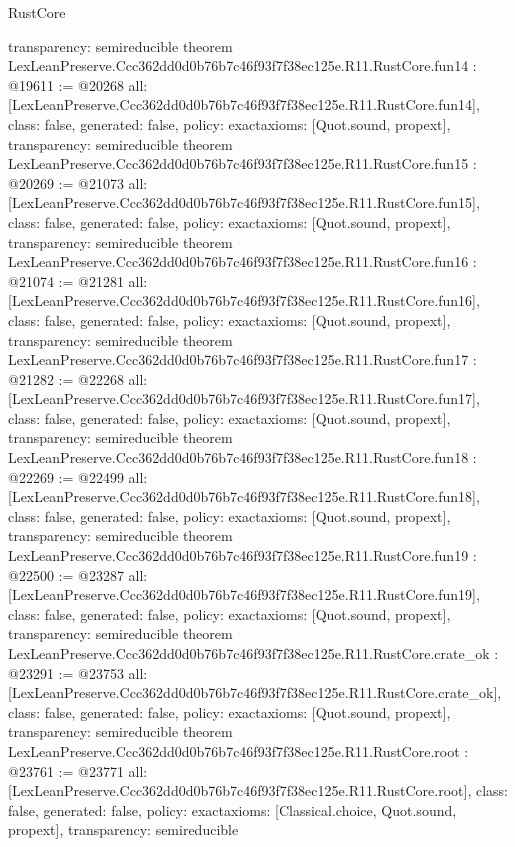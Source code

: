 \begin{lexlean}{RustCore}
\begin{coremodule}
{  transparency: semireducible
}
theorem LexLeanPreserve.Ccc362dd0d0b76b7c46f93f7f38ec125e.R11.RustCore.fun14 : @19611 := @20268 {
  all: [LexLeanPreserve.Ccc362dd0d0b76b7c46f93f7f38ec125e.R11.RustCore.fun14],
  class: false,
  generated: false,
  policy: exact{axioms: [Quot.sound, propext]},
  transparency: semireducible
}
theorem LexLeanPreserve.Ccc362dd0d0b76b7c46f93f7f38ec125e.R11.RustCore.fun15 : @20269 := @21073 {
  all: [LexLeanPreserve.Ccc362dd0d0b76b7c46f93f7f38ec125e.R11.RustCore.fun15],
  class: false,
  generated: false,
  policy: exact{axioms: [Quot.sound, propext]},
  transparency: semireducible
}
theorem LexLeanPreserve.Ccc362dd0d0b76b7c46f93f7f38ec125e.R11.RustCore.fun16 : @21074 := @21281 {
  all: [LexLeanPreserve.Ccc362dd0d0b76b7c46f93f7f38ec125e.R11.RustCore.fun16],
  class: false,
  generated: false,
  policy: exact{axioms: [Quot.sound, propext]},
  transparency: semireducible
}
theorem LexLeanPreserve.Ccc362dd0d0b76b7c46f93f7f38ec125e.R11.RustCore.fun17 : @21282 := @22268 {
  all: [LexLeanPreserve.Ccc362dd0d0b76b7c46f93f7f38ec125e.R11.RustCore.fun17],
  class: false,
  generated: false,
  policy: exact{axioms: [Quot.sound, propext]},
  transparency: semireducible
}
theorem LexLeanPreserve.Ccc362dd0d0b76b7c46f93f7f38ec125e.R11.RustCore.fun18 : @22269 := @22499 {
  all: [LexLeanPreserve.Ccc362dd0d0b76b7c46f93f7f38ec125e.R11.RustCore.fun18],
  class: false,
  generated: false,
  policy: exact{axioms: [Quot.sound, propext]},
  transparency: semireducible
}
theorem LexLeanPreserve.Ccc362dd0d0b76b7c46f93f7f38ec125e.R11.RustCore.fun19 : @22500 := @23287 {
  all: [LexLeanPreserve.Ccc362dd0d0b76b7c46f93f7f38ec125e.R11.RustCore.fun19],
  class: false,
  generated: false,
  policy: exact{axioms: [Quot.sound, propext]},
  transparency: semireducible
}
theorem LexLeanPreserve.Ccc362dd0d0b76b7c46f93f7f38ec125e.R11.RustCore.crate_ok : @23291 := @23753 {
  all: [LexLeanPreserve.Ccc362dd0d0b76b7c46f93f7f38ec125e.R11.RustCore.crate_ok],
  class: false,
  generated: false,
  policy: exact{axioms: [Quot.sound, propext]},
  transparency: semireducible
}
theorem LexLeanPreserve.Ccc362dd0d0b76b7c46f93f7f38ec125e.R11.RustCore.root : @23761 := @23771 {
  all: [LexLeanPreserve.Ccc362dd0d0b76b7c46f93f7f38ec125e.R11.RustCore.root],
  class: false,
  generated: false,
  policy: exact{axioms: [Classical.choice, Quot.sound, propext]},
  transparency: semireducible
}


\end{coremodule}
\end{lexlean}
